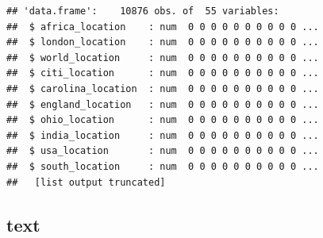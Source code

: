 \documentclass[
]{article}
\begin{document}
\begin{verbatim}
## 'data.frame':    10876 obs. of  55 variables:
##  $ africa_location    : num  0 0 0 0 0 0 0 0 0 0 ...
##  $ london_location    : num  0 0 0 0 0 0 0 0 0 0 ...
##  $ world_location     : num  0 0 0 0 0 0 0 0 0 0 ...
##  $ citi_location      : num  0 0 0 0 0 0 0 0 0 0 ...
##  $ carolina_location  : num  0 0 0 0 0 0 0 0 0 0 ...
##  $ england_location   : num  0 0 0 0 0 0 0 0 0 0 ...
##  $ ohio_location      : num  0 0 0 0 0 0 0 0 0 0 ...
##  $ india_location     : num  0 0 0 0 0 0 0 0 0 0 ...
##  $ usa_location       : num  0 0 0 0 0 0 0 0 0 0 ...
##  $ south_location     : num  0 0 0 0 0 0 0 0 0 0 ...
##   [list output truncated]
\end{verbatim}

\hypertarget{text}{%
\subsection{text}\label{text}}
\end{document}
